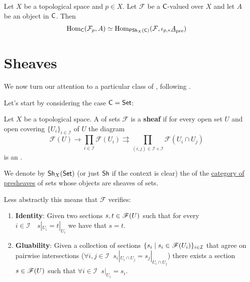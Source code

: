 \documentclass[../main.tex]{subfiles}
\begin{document}
\begin{corollary}\label{cor:stalk-constant-adjunction-presheaf}
  Let \(X\) be a topological space and \(p \in X\).
  Let \(\mathcal{F}\) be a \(\mathsf{C}\)-valued  over \(X\) and let \(A\) be an object in \(\mathsf{C}\).
  Then
  \begin{equation*}
    \operatorname{Hom}_{\mathsf{C}}(\mathcal{F}_{p}, A) \simeq \operatorname{Hom}_{\mathsf{PSh}_{X}(\mathsf{C})}(\mathcal{F}, \iota_{p, \ast}\underline{A}_{\operatorname*{pre}})
  \end{equation*}
\end{corollary}


\section{Sheaves}
We now turn our attention to a particular class of , following \cite[\href{https://stacks.math.columbia.edu/tag/00VL}{Tag 00VL}]{stacks-project}.

Let's start by considering the case \(\mathsf{C} = \mathsf{Set}\):
\begin{definition} \label{def:sheaf-set}
  Let \(X\) be a topological space.
  A  of sets \(\mathcal{F}\) is a \textbf{sheaf} if for every open set \(U\) and open covering \(\{U_{i}\}_{i \in \mathcal{I}}\) of \(U\) the diagram
  \begin{equation} \label{diagram:sheaf-condition}
    \mathcal{F}(U) \to \prod_{i \in \mathcal{I}} \mathcal{F}(U_{i}) \rightrightarrows \prod_{(i, j) \in \mathcal{I} \times \mathcal{I}} \mathcal{F}(U_{i} \cap U_{j})
  \end{equation}
  is an .

  We denote by \(\mathsf{Sh}_{X}(\mathsf{Set})\) (or just \(\mathsf{Sh}\) if the context is clear) the  of the \hyperref[def:presheaf]{category of presheaves} of sets whose objects are sheaves of sets.

  Less abstractly this means that \(\mathcal{F}\) verifies:
  \begin{enumerate}[label=SH.\arabic*), ref=SH.\arabic*]
    \item\label{axiom:sheaf-identity} \textbf{Identity}: Given two sections \(s, t \in \mathscr{F}(U)\) such that for every \(i \in \mathcal{I} \quad s|_{U_{i}} = t|_{U_{i}}\) we have that \(s = t\).
    \item\label{axiom:sheaf-gluability} \textbf{Gluability}: Given a collection of sections \(\{s_{i} \mid s_{i} \in \mathscr{F}(U_{i})\}_{i \in \mathcal{I}}\) that agree on pairwise intersections (\(\forall i, j \in \mathcal{I} \;\; s_{i}|_{U_{i} \cap U_{j}} = s_{j}|_{U_{i} \cap U_{j}}\)) there exists a section \(s \in \mathscr{F}(U)\) such that \(\forall i \in \mathcal{I} \;\; s|_{U_{i}} = s_{i}\).
  \end{enumerate}
\end{definition}
\end{document}

